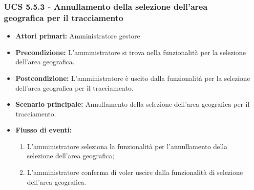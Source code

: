 \subsubsection{UCS 5.5.3 - Annullamento della selezione dell'area geografica per il tracciamento}%
\begin{itemize}
\item \textbf{Attori primari:} Amministratore gestore
\item \textbf{Precondizione:} L'amministratore si trova nella funzionalità per la selezione dell'area geografica.
\item \textbf{Postcondizione:} L'amministratore è uscito dalla funzionalità per la selezione dell'area geografica per il tracciamento.
\item \textbf{Scenario principale:} Annullamento della selezione dell'area geografica per il tracciamento.
\item \textbf{Flusso di eventi:}
    \begin{enumerate}
    \item L'amministratore seleziona la funzionalità per l'annullamento della selezione dell'area geografica;
    \item L'amministratore conferma di voler uscire dalla funzionalità di selezione dell'area geografica.
    \end{enumerate} 
\end{itemize}